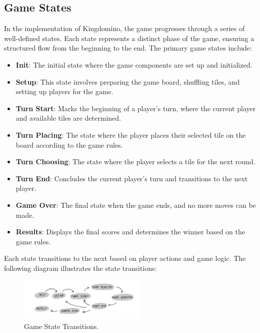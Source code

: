 \documentclass[conference]{IEEEtran}
\begin{document}
\subsection{Game States}

In the implementation of Kingdomino, the game progresses through a series of
well-defined states. Each state represents a distinct phase of the game,
ensuring a structured flow from the beginning to the end. The primary game
states include:

\begin{itemize}
    \item \textbf{Init}: The initial state where the game components are set up and initialized.
    \item \textbf{Setup}: This state involves preparing the game board, shuffling tiles, and setting up players for the game.
    \item \textbf{Turn Start}: Marks the beginning of a player's turn, where the current player and available tiles are determined.
    \item \textbf{Turn Placing}: The state where the player places their selected tile on the board according to the game rules.
    \item \textbf{Turn Choosing}: The state where the player selects a tile for the next round.
    \item \textbf{Turn End}: Concludes the current player's turn and transitions to the next player.
    \item \textbf{Game Over}: The final state when the game ends, and no more moves can be made.
    \item \textbf{Results}: Displays the final scores and determines the winner based on the game rules.
\end{itemize}

Each state transitions to the next based on player actions and game logic. The
following diagram illustrates the state transitions:

\begin{figure}[htbp]
    \centerline{\includegraphics[width=0.55\textwidth]{assets/states.png}}
    \caption{Game State Transitions.}\label{fig:game_states}
\end{figure}
\end{document}
